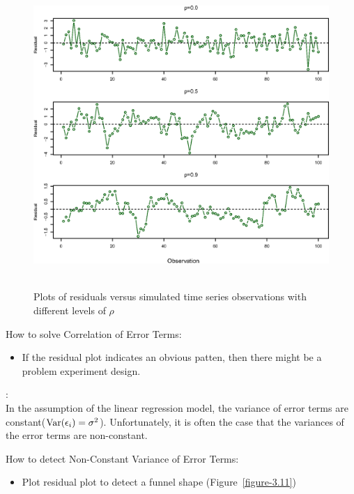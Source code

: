     \documentclass[12pt,fleqn,a4paper]{article}%
\theoremstyle{definition}
\theoremstyle{plain}
\numberwithin{equation}{section}
\begin{document}
\begin{figure}[H]
\centering
\includegraphics[scale=0.85]{images//3_10.eps}
\\~\\
\caption{Plots of residuals versus simulated time series observations with different levels of $\rho$}\label{figure-3.10}
\end{figure}

How to solve Correlation of Error Terms:
\begin{itemize}
\item If the residual plot indicates an obvious patten, then there might be a problem experiment design.
\end{itemize}

\textbf{\color{blue}{3. Non-Constant Variance of Error Terms(Heteroscedasticity)}}:\\
In the assumption of the linear regression model, the variance of error terms are constant(${\rm Var}(\epsilon_{i})=\sigma^{2}$).
Unfortunately, it is often the case that the variances of the error terms are non-constant.

How to detect Non-Constant Variance of Error Terms:
\begin{itemize}
\item Plot residual plot to detect a funnel shape (Figure~\ref{figure-3.11})
\end{itemize}
\end{document}

